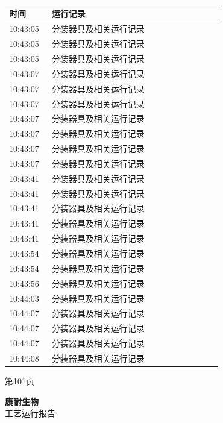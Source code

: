\documentclass[UTF8,10pt,a4paper,fontset=fandol]{ctexart}
\begin{document}
\begin{center}
\begin{minipage}[t]{0.46\linewidth}
\vspace{4pt}
\begin{tabular}{|p{0.18\linewidth}|p{0.72\linewidth}|}
\hline
时间 & 运行记录 \\ \hline
10:43:05 & 分装器具及相关运行记录 \\ \hline
10:43:05 & 分装器具及相关运行记录 \\ \hline
10:43:05 & 分装器具及相关运行记录 \\ \hline
10:43:07 & 分装器具及相关运行记录 \\ \hline
10:43:07 & 分装器具及相关运行记录 \\ \hline
10:43:07 & 分装器具及相关运行记录 \\ \hline
10:43:07 & 分装器具及相关运行记录 \\ \hline
10:43:07 & 分装器具及相关运行记录 \\ \hline
10:43:07 & 分装器具及相关运行记录 \\ \hline
10:43:07 & 分装器具及相关运行记录 \\ \hline
10:43:41 & 分装器具及相关运行记录 \\ \hline
10:43:41 & 分装器具及相关运行记录 \\ \hline
10:43:41 & 分装器具及相关运行记录 \\ \hline
10:43:41 & 分装器具及相关运行记录 \\ \hline
10:43:41 & 分装器具及相关运行记录 \\ \hline
10:43:54 & 分装器具及相关运行记录 \\ \hline
10:43:54 & 分装器具及相关运行记录 \\ \hline
10:43:56 & 分装器具及相关运行记录 \\ \hline
10:44:03 & 分装器具及相关运行记录 \\ \hline
10:44:07 & 分装器具及相关运行记录 \\ \hline
10:44:07 & 分装器具及相关运行记录 \\ \hline
10:44:07 & 分装器具及相关运行记录 \\ \hline
10:44:08 & 分装器具及相关运行记录 \\ \hline
\end{tabular}

\vspace{3pt}
第101页
\end{minipage}
\hfill
\begin{minipage}[t]{0.46\linewidth}
\centering
\textbf{康耐生物}\\[2pt]
工艺运行报告


\end{minipage}
\end{center}
\end{document}
